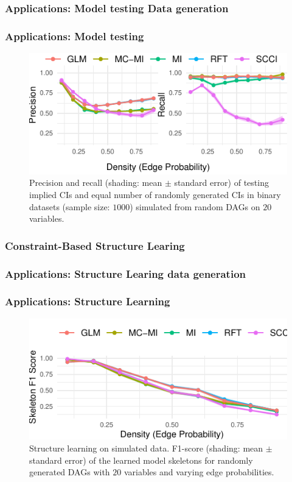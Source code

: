 \documentclass{beamer}
\begin{document}
\begin{frame}
	\frametitle{Applications: Model testing Data generation}
\end{frame}

\begin{frame}
	\frametitle{Applications: Model testing}
	\begin{figure}
		\centering
		\includegraphics{imgs/model_testing.pdf}
		\caption*{Precision and recall (shading: mean $\pm$ standard
		error) of testing implied CIs and equal number of randomly
		generated CIs in binary datasets (sample size: $1000$)
		simulated from random DAGs on $ 20 $ variables.}
	\end{figure}
\end{frame}

\begin{frame}
	\frametitle{Constraint-Based Structure Learing}
\end{frame}

\begin{frame}
	\frametitle{Applications: Structure Learing data generation}
\end{frame}

\begin{frame}
	\frametitle{Applications: Structure Learning}
	\begin{figure}
		\centering
		\includegraphics{imgs/sl_density.pdf}
		\caption*{Structure learning on simulated data. F1-score
		(shading: mean $\pm$ standard error) of the learned model
		skeletons for randomly generated DAGs with $20$ variables and
		varying edge probabilities.}
	\end{figure}
\end{frame}
\end{document}
